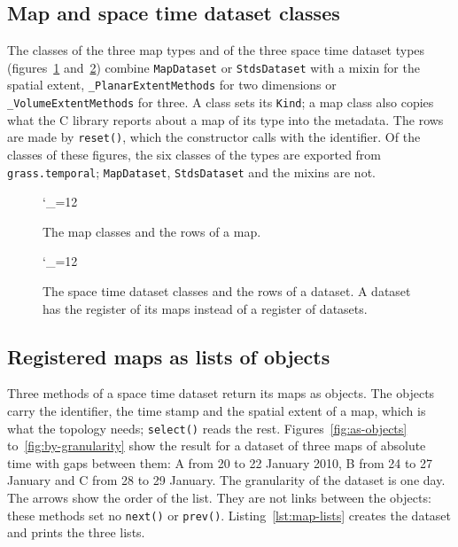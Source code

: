 \documentclass[10pt,a4paper]{article}
\newcommand{\umlfigure}[1]{%
  \begingroup\catcode`\_=12 \ttfamily\endgroup}
\newcommand{\code}[1]{\texttt{#1}}
\begin{document}
\subsection{Map and space time dataset classes}

The classes of the three map types and of the three space time dataset types
(figures~\ref{fig:maps} and~\ref{fig:stds}) combine \code{MapDataset} or
\code{StdsDataset} with a mixin for the spatial extent, \code{\_PlanarExtentMethods}
for two dimensions or \code{\_VolumeExtentMethods} for three. A class sets its
\code{Kind}; a map class also copies what the C library reports about a map of
its type into the metadata. The rows are made by \code{reset()}, which the
constructor calls with the identifier. Of the classes of these figures, the
six classes of the types are exported from \code{grass.temporal};
\code{MapDataset}, \code{StdsDataset} and the mixins are not.

\begin{figure}[ht]
\centering
\umlfigure{maps}
\caption{The map classes and the rows of a map.}
\label{fig:maps}
\end{figure}

\begin{figure}[ht]
\centering
\umlfigure{stds}
\caption{The space time dataset classes and the rows of a dataset. A dataset
has the register of its maps instead of a register of datasets.}
\label{fig:stds}
\end{figure}

\FloatBarrier
\subsection{Registered maps as lists of objects}

Three methods of a space time dataset return its maps as objects. The
objects carry the identifier, the time stamp and the spatial extent of a map,
which is what the topology needs; \code{select()} reads the rest.
Figures~\ref{fig:as-objects} to~\ref{fig:by-granularity} show the result
for a dataset of three maps of absolute time with gaps between them: A from
20 to 22 January 2010, B from 24 to 27 January and C from 28 to 29 January.
The granularity of the dataset is one day. The arrows show the order of the
list. They are not links between the objects: these methods set no
\code{next()} or \code{prev()}. Listing~\ref{lst:map-lists} creates the dataset
and prints the three lists.
\end{document}
